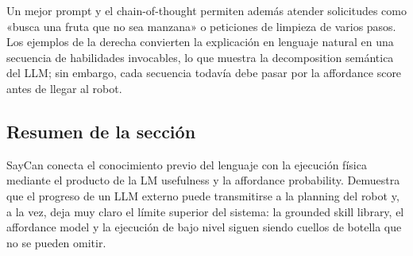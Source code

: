 
Un mejor prompt y el chain-of-thought permiten además atender solicitudes como «busca una fruta que no sea manzana» o peticiones de limpieza de varios pasos. Los ejemplos de la derecha convierten la explicación en lenguaje natural en una secuencia de habilidades invocables, lo que muestra la decomposition semántica del LLM; sin embargo, cada secuencia todavía debe pasar por la affordance score antes de llegar al robot.



\subsection{Resumen de la sección}

SayCan conecta el conocimiento previo del lenguaje con la ejecución física mediante el producto de la LM usefulness y la affordance probability. Demuestra que el progreso de un LLM externo puede transmitirse a la planning del robot y, a la vez, deja muy claro el límite superior del sistema: la grounded skill library, el affordance model y la ejecución de bajo nivel siguen siendo cuellos de botella que no se pueden omitir.
